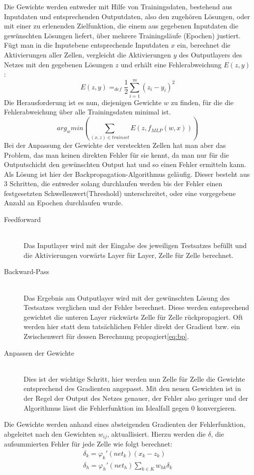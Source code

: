 Die Gewichte werden entweder mit Hilfe von Trainingsdaten, bestehend aus Inputdaten und entsprechenden Outputdaten, also den zugehören Lösungen, oder mit einer zu erlenenden Zielfunktion, die einem aus gegebenen Inputdaten die gewünschten Lösungen liefert, über mehrere Trainingsläufe (Epochen) justiert. Fügt man in die Inputebene entsprechende Inputdaten \(x\) ein, berechnet die Aktivierungen aller Zellen, vergleicht die Aktivierungen \(y\) des Outputlayers des Netzes mit den gegebenen Lösungen \(z\) und erhält eine Fehlerabweichung \( E(z,y)\): 
\begin{equation}
E(z,y) =_{def} \dfrac{1}{2} \sum_{i=1}^{m}(z_{i}-y_{i})^{2}
	\label{eq:err}
\end{equation}
Die Herausforderung ist es nun, diejenigen Gewichte \(w\) zu finden, für die die Fehlerabweichung über alle Trainingsdaten minimal ist.
\begin{equation}
arg_{w} min( \sum_{(x,z)\in trainset} E(z,f_{MLP}(w,x)))
\label{eq:err}
\end{equation}
Bei der Anpassung der Gewichte der versteckten Zellen hat man aber das Problem, das man keinen direkten Fehler für sie kennt, da man nur für die Outputschicht den gewünschten Output hat und so einen Fehler ermitteln kann. Als Lösung ist hier der Backpropagation-Algorithmus geläufig. Dieser besteht aus 3 Schritten, die entweder solang durchlaufen werden bis der Fehler einen festgesetzten Schwellenwert(Threshold) unterschreitet, oder eine vorgegebene Anzahl an Epochen durchlaufen wurde. 
\begin{description}	\item[Feedforward]\hfill \\
	Das Inputlayer wird mit der Eingabe des jeweiligen Testsatzes befüllt und die Aktivierungen vorwärts Layer für Layer, Zelle für Zelle berechnet.  
	\item[Backward-Pass]\hfill \\ 
	Das Ergebnis am Outputlayer wird mit der gewünschten Lösung des Testsatzes verglichen und der Fehler berechnet. Diese werden entsprechend gewichtet die unteren Layer rückwärts Zelle für Zelle rückpropagiert. Oft werden hier statt dem tatsächlichen Fehler direkt der Gradient bzw. ein Zwischenwert für dessen Berechnung propagiert\ref{eq:bp}.
	\item[Anpassen der Gewichte]\hfill \\ Dies ist der wichtige Schritt, hier werden nun Zelle für Zelle die Gewichte entsprechend des Gradienten angepasst. Mit den neuen Gewichten ist in der Regel der Output des Netzes genauer, der Fehler also geringer und der Algorithmus lässt die Fehlerfunktion im Idealfall gegen 0 konvergieren.\cite{bib:nn}
\end{description}
Die Gewichte werden anhand eines absteigenden Gradienten der Fehlerfunktion, abgeleitet nach den Gewichten \(w_{ij}\), aktuallisiert.  Hierzu werden die \(\delta\), die aufsummierten Fehler für jede Zelle wie folgt berechnet: 
\begin{gather}
\delta_{k} = \varphi_{k}'(net_{k})(x_{k}-z_{k}) \\
\delta_{h} = \varphi_{h}'(net_{h})\sum_{k\in K}w_{hk}\delta_{k} 
\label{eq:err}
\end{gather}

